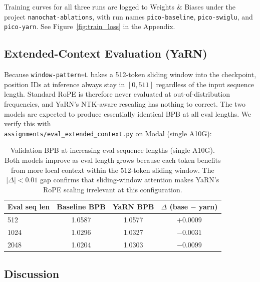 \documentclass[a4paper,12pt]{article}
\begin{document}
Training curves for all three runs are logged to Weights \& Biases under the
project \texttt{nanochat-ablations}, with run names \texttt{pico-baseline},
\texttt{pico-swiglu}, and \texttt{pico-yarn}.  See Figure~\ref{fig:train_loss} in
the Appendix.

\subsection{Extended-Context Evaluation (YaRN)}

Because \texttt{window-pattern=L} bakes a 512-token sliding window into
the checkpoint, position IDs at inference always stay in $[0, 511]$ regardless
of the input sequence length.  Standard RoPE is therefore never evaluated
at out-of-distribution frequencies, and YaRN's NTK-aware rescaling has
nothing to correct.  The two models are expected to produce essentially
identical BPB at all eval lengths.  We verify this with \\
\texttt{assignments/eval\_extended\_context.py} on Modal (single A10G):

\begin{table}[H]
\centering
\begin{tabular}{lccc}
\toprule
\textbf{Eval seq len} & \textbf{Baseline BPB} & \textbf{YaRN BPB} & \textbf{$\Delta$ (base $-$ yarn)} \\
\midrule
512  & 1.0587 & 1.0577 & $+0.0009$ \\
1024 & 1.0296 & 1.0327 & $-0.0031$ \\
2048 & 1.0204 & 1.0303 & $-0.0099$ \\
\bottomrule
\end{tabular}
\caption{Validation BPB at increasing eval sequence lengths (single A10G).
  Both models improve as eval length grows because each token benefits from
  more local context within the 512-token sliding window.
  The $|\Delta| < 0.01$ gap confirms that sliding-window attention
  makes YaRN's RoPE scaling irrelevant at this configuration.}
\label{tab:yarn_context}
\end{table}

\subsection{Discussion}
\end{document}
